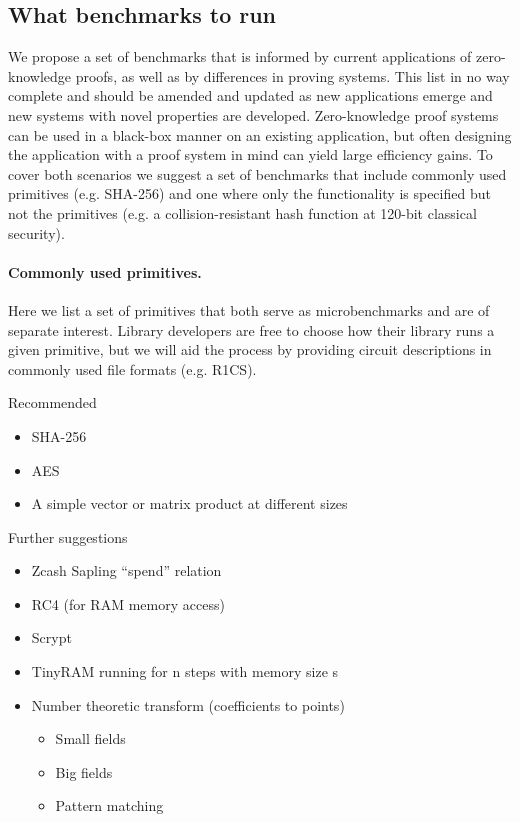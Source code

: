 \subsection{What benchmarks to run}
We propose a set of benchmarks that is informed by current applications of zero-knowledge proofs, as well as by differences in proving systems. This list in no way complete and should be amended and updated as new applications emerge and new systems with novel properties are developed. Zero-knowledge proof systems can be used in a black-box manner on an existing application, but often designing the application with a proof system in mind can yield large efficiency gains. To cover both scenarios we suggest a set of benchmarks that include commonly used primitives (e.g. SHA-256) and one where only the functionality is specified but not the primitives (e.g. a collision-resistant hash function at 120-bit classical security). 


\paragraph{Commonly used primitives.}

Here we list a set of primitives that both serve as microbenchmarks and are of separate interest. Library developers are free to choose how their library runs a given primitive, but we will aid the process by providing circuit descriptions in commonly used file formats (e.g. R1CS). 

Recommended
\begin{itemize}[label={- }]
    \item SHA-256
    \item AES
    \item A simple vector or matrix product at different sizes
\end{itemize}
Further suggestions
\begin{itemize}[label={- }]
    \item Zcash Sapling “spend” relation
    \item RC4 (for RAM memory access)
    \item Scrypt
    \item TinyRAM running for n steps with memory size s 
    \item Number theoretic transform (coefficients to points)
		\begin{itemize}[label={- }]
        \item Small fields 
        \item Big fields
        \item Pattern matching
		\end{itemize}
\end{itemize}


